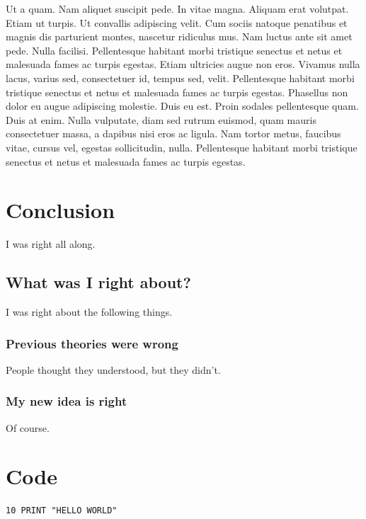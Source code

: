 \documentclass[a4paper,11pt]{report}
\begin{document}
Ut a quam. Nam aliquet suscipit pede. In vitae magna. Aliquam erat volutpat. Etiam ut turpis. Ut convallis adipiscing velit. Cum sociis natoque penatibus et magnis dis parturient montes, nascetur ridiculus mus. Nam luctus ante sit amet pede. Nulla facilisi. Pellentesque habitant morbi tristique senectus et netus et malesuada fames ac turpis egestas. Etiam ultricies augue non eros. Vivamus nulla lacus, varius sed, consectetuer id, tempus sed, velit. Pellentesque habitant morbi tristique senectus et netus et malesuada fames ac turpis egestas. Phasellus non dolor eu augue adipiscing molestie. Duis eu est. Proin sodales pellentesque quam. Duis at enim. Nulla vulputate, diam sed rutrum euismod, quam mauris consectetuer massa, a dapibus nisi eros ac ligula. Nam tortor metus, faucibus vitae, cursus vel, egestas sollicitudin, nulla. Pellentesque habitant morbi tristique senectus et netus et malesuada fames ac turpis egestas.


\chapter{Conclusion}
\label{chap:conc}

I was right all along.

\section{What was I right about?}

I was right about the following things.

\subsection{Previous theories were wrong}

People thought they understood, but they didn't.

\subsection{My new idea is right}

Of course.


\clearpage
{}
{}



\appendix


\chapter{Code}
\label{app:code}

\begin{verbatim}
10 PRINT "HELLO WORLD"
\end{verbatim}


\end{document}
